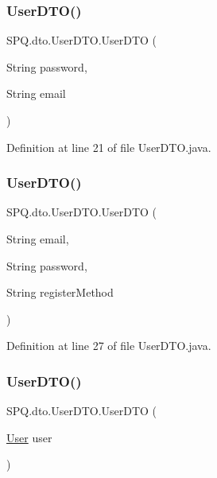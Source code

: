\subsubsection{\texorpdfstring{User\+D\+T\+O()}{UserDTO()}\hspace{0.1cm}{\footnotesize\ttfamily [2/11]}}
{\footnotesize\ttfamily S\+P\+Q.\+dto.\+User\+D\+T\+O.\+User\+D\+TO (\begin{DoxyParamCaption}\item[{String}]{password,  }\item[{String}]{email }\end{DoxyParamCaption})}



Definition at line 21 of file User\+D\+T\+O.\+java.

\mbox{\label{class_s_p_q_1_1dto_1_1_user_d_t_o_a97b230ddb1c2eb2cbd7ced33922fb2d2}} 
\subsubsection{\texorpdfstring{User\+D\+T\+O()}{UserDTO()}\hspace{0.1cm}{\footnotesize\ttfamily [3/11]}}
{\footnotesize\ttfamily S\+P\+Q.\+dto.\+User\+D\+T\+O.\+User\+D\+TO (\begin{DoxyParamCaption}\item[{String}]{email,  }\item[{String}]{password,  }\item[{String}]{register\+Method }\end{DoxyParamCaption})}



Definition at line 27 of file User\+D\+T\+O.\+java.

\mbox{\label{class_s_p_q_1_1dto_1_1_user_d_t_o_a40cad7b1dea2117ed4cb0e69fdc6b929}} 
\subsubsection{\texorpdfstring{User\+D\+T\+O()}{UserDTO()}\hspace{0.1cm}{\footnotesize\ttfamily [4/11]}}
{\footnotesize\ttfamily S\+P\+Q.\+dto.\+User\+D\+T\+O.\+User\+D\+TO (\begin{DoxyParamCaption}\item[{\mbox{\hyperlink{class_s_p_q_1_1data_1_1_user}{User}}}]{user }\end{DoxyParamCaption})}



